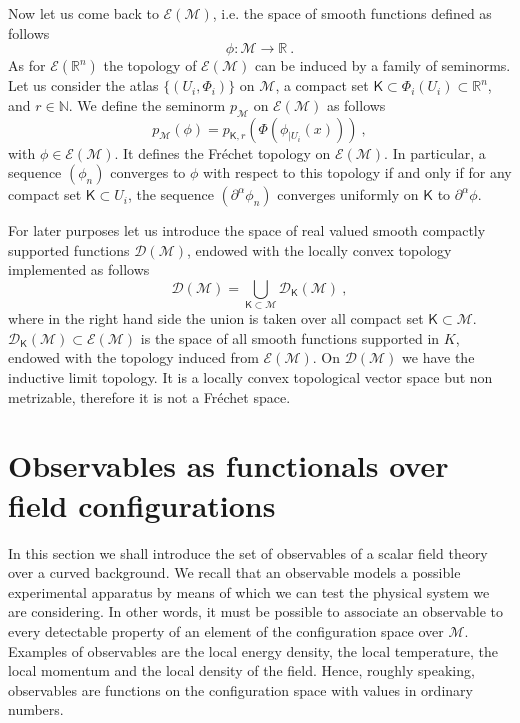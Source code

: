 \documentclass[11pt]{book}
\newcommand{\Dcal}{\mathcal{D}}
\newcommand{\Ecal}{\mathcal{E}}
\newcommand{\Mcal}{\mathcal{M}}
\newcommand{\Nbb}{\mathbb{N}}
\newcommand{\Rbb}{\mathbb{R}}
\newcommand{\Ksf}{\mathsf{K}}
\theoremstyle{break}
\begin{document}
Now let us come back to $\Ecal(\Mcal)$, i.e. the space of smooth functions defined as follows
%
\begin{equation*}
\phi : \Mcal \to \Rbb \ . 
\end{equation*}
%
As for $\Ecal(\Rbb^n)$ the topology of $\Ecal(\Mcal)$ can be induced by a family of seminorms. Let us consider the atlas $\{(U_i,\Phi_i)\}$ on $\Mcal$, a compact set $\Ksf \subset \Phi_i(U_i) \subset \Rbb^n$, and $r \in \Nbb$. We define the seminorm $p_\Mcal$ on $\Ecal(\Mcal)$ as follows
%
\begin{equation*}
p_\Mcal(\phi) = p_{\Ksf,r}\left( \Phi\left( \phi_{|U_i}(x) \right) \right) \ ,
\end{equation*}
%
with $\phi \in \Ecal\left(\Mcal \right)$. It defines the Fréchet topology on $\Ecal\left(\Mcal \right)$. In particular, a sequence $(\phi_n)$ converges to $\phi$ with respect to this topology if and only if for any compact set $\Ksf \subset U_i$, the sequence $\left(\partial^\alpha\phi_n\right)$ converges uniformly on $\Ksf$ to $\partial^\alpha\phi$.


For later purposes let us introduce the space of real valued smooth compactly supported functions $\Dcal(\Mcal)$, endowed with the locally convex topology implemented as follows
%
\begin{equation*}
\Dcal(\Mcal) = \bigcup_{\Ksf\subset\Mcal} \Dcal_{\Ksf}(\Mcal) \ ,
\end{equation*}
%
where in the right hand side the union is taken over all compact set $\Ksf \subset \Mcal$. $\Dcal_\Ksf(\Mcal) \subset \Ecal(\Mcal)$ is the space of all smooth functions supported in $K$, endowed with the topology induced from $\Ecal(\Mcal)$. On $\Dcal(\Mcal)$ we have the inductive limit topology. It is a locally convex topological vector space but non metrizable, therefore it is not a Fréchet space. 


\section{Observables as functionals over field configurations}\label{p:OBS}


In this section we shall introduce the set of observables of a scalar field theory over a curved background. We recall that an observable models a possible experimental apparatus by means of which we can test the physical system we are considering. In other words, it must be possible to associate an observable to every detectable property of an element of the configuration space over $\Mcal$. Examples of observables are the local energy density, the local temperature, the local momentum and the local density of the field.  Hence, roughly speaking, observables are functions on the configuration space with values in ordinary numbers.
\end{document}
